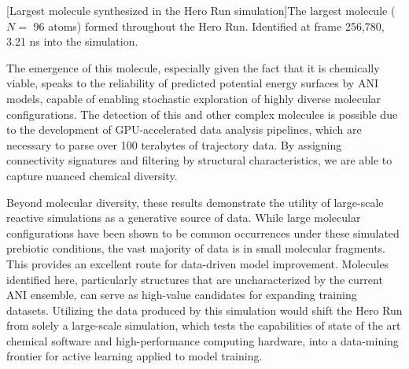 \begin{flushleft}
\begin{multiFigure}
[Largest molecule synthesized in the Hero Run simulation]{The largest molecule ($N=$ 96 atoms) formed throughout the Hero Run. Identified at frame 256,780, 3.21 ns into the simulation.}
\label{fig:largest_mol}
\end{multiFigure}
\end{flushleft}

The emergence of this molecule, especially given the fact that it is chemically viable, speaks to the reliability of predicted potential energy surfaces by ANI models, capable of enabling stochastic exploration of highly diverse molecular configurations.
The detection of this and other complex molecules is possible due to the development of GPU-accelerated data analysis pipelines, which are necessary to parse over 100 terabytes of trajectory data.
By assigning connectivity signatures and filtering by structural characteristics, we are able to capture nuanced chemical diversity.

Beyond molecular diversity, these results demonstrate the utility of large-scale reactive simulations as a generative source of data.
While large molecular configurations have been shown to be common occurrences under these simulated prebiotic conditions, the vast majority of data is in small molecular fragments.
This provides an excellent route for data-driven model improvement.
Molecules identified here, particularly structures that are uncharacterized by the current ANI ensemble, can serve as high-value candidates for expanding training datasets. 
Utilizing the data produced by this simulation would shift the Hero Run from solely a large-scale simulation, which tests the capabilities of state of the art chemical software and high-performance computing hardware, into a data-mining frontier for active learning applied to model training.
